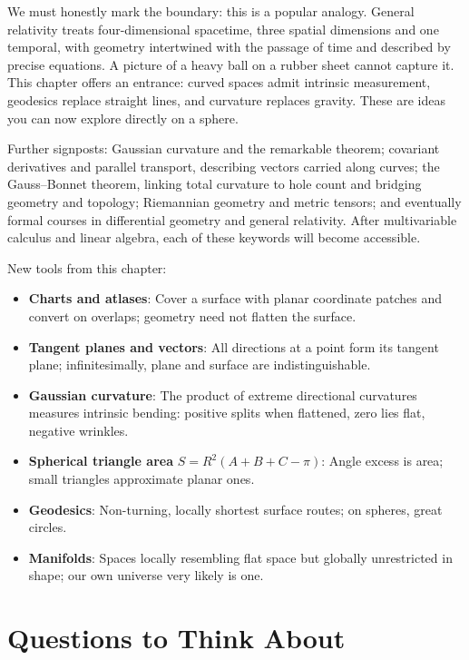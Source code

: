 We must honestly mark the boundary: this is a popular analogy. General relativity treats four-dimensional spacetime, three spatial dimensions and one temporal, with geometry intertwined with the passage of time and described by precise equations. A picture of a heavy ball on a rubber sheet cannot capture it. This chapter offers an entrance: curved spaces admit intrinsic measurement, geodesics replace straight lines, and curvature replaces gravity. These are ideas you can now explore directly on a sphere.

\begin{pandeng}
Further signposts: Gaussian curvature and the remarkable theorem; covariant derivatives and parallel transport, describing vectors carried along curves; the Gauss--Bonnet theorem, linking total curvature to hole count and bridging geometry and topology; Riemannian geometry and metric tensors; and eventually formal courses in differential geometry and general relativity. After multivariable calculus and linear algebra, each of these keywords will become accessible.
\end{pandeng}

\begin{toolbox}
New tools from this chapter:

\begin{itemize}
  \item \textbf{Charts and atlases}: Cover a surface with planar coordinate patches and convert on overlaps; geometry need not flatten the surface.
  \item \textbf{Tangent planes and vectors}: All directions at a point form its tangent plane; infinitesimally, plane and surface are indistinguishable.
  \item \textbf{Gaussian curvature}: The product of extreme directional curvatures measures intrinsic bending: positive splits when flattened, zero lies flat, negative wrinkles.
  \item \textbf{Spherical triangle area} $S=R^2(A+B+C-\pi)$: Angle excess is area; small triangles approximate planar ones.
  \item \textbf{Geodesics}: Non-turning, locally shortest surface routes; on spheres, great circles.
  \item \textbf{Manifolds}: Spaces locally resembling flat space but globally unrestricted in shape; our own universe very likely is one.
\end{itemize}
\end{toolbox}

\section*{Questions to Think About}


